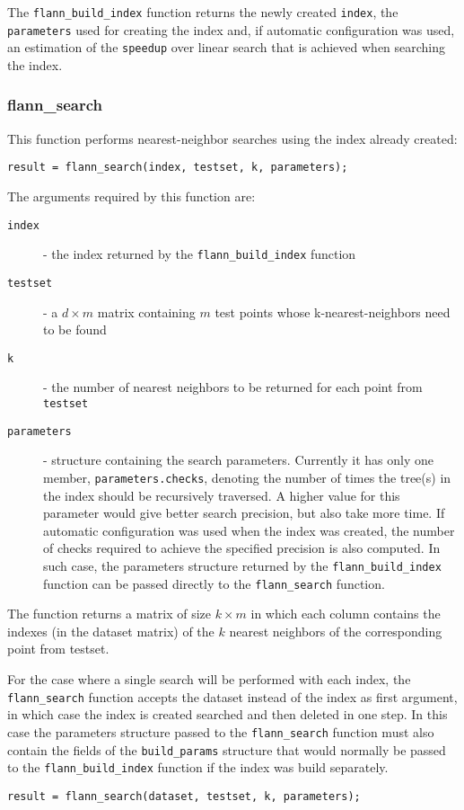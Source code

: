 \documentclass[letter,10pt]{article}
\begin{document}
The \texttt{flann\_build\_index} function returns the newly created
\texttt{index}, the \texttt{parameters} used for creating the index and, if
automatic configuration was used, an estimation of the \texttt{speedup}
over linear search that is achieved when searching the index.




\subsubsection{flann\_search}

This function performs nearest-neighbor searches using the index already
created:
\begin{Verbatim}
result = flann_search(index, testset, k, parameters);
\end{Verbatim}

The arguments required by this function are:
\begin{description}
\item[\texttt{index}] - the index returned by the
\texttt{flann\_build\_index} function
\item[\texttt{testset}] - a $d \times m$ matrix containing $m$ test points
whose k-nearest-neighbors need to be found
\item[\texttt{k}] - the number of nearest neighbors to be returned for each
point from \texttt{testset}
\item[\texttt{parameters}] - structure containing the search parameters.
Currently it has only one member, \texttt{parameters.checks}, denoting the
number of times the tree(s) in the index should be recursively traversed. A
higher value for this parameter would give better search precision, but
also take more time. If automatic configuration was used when the
index was created, the number of checks required to achieve the specified
precision is also computed. In such case, the parameters structure returned
by the \texttt{flann\_build\_index} function can be passed directly to the
\texttt{flann\_search} function.
\end{description}

The function returns a matrix of size $k \times m$ in which each column contains the indexes (in the dataset matrix) of the $k$ nearest neighbors of the corresponding point from testset.

For the case where a single search will be performed with each index, the
\texttt{flann\_search} function accepts the dataset instead of the index as
first argument, in which case the index is created searched and then
deleted in one step. In this case the parameters structure passed to the
\texttt{flann\_search} function must also contain the fields of the
\texttt{build\_params} structure that would normally be passed to the
\texttt{flann\_build\_index} function if the index was build separately.
\begin{Verbatim}
result = flann_search(dataset, testset, k, parameters);
\end{Verbatim}
\end{document}
